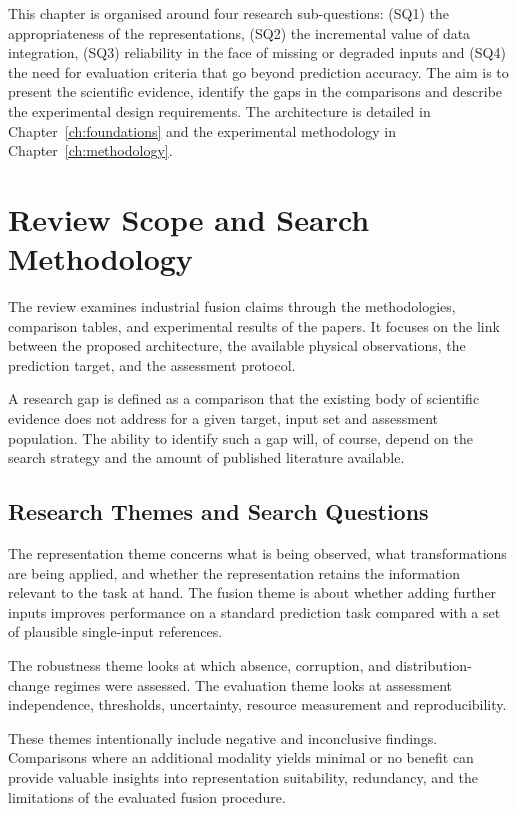 This chapter is organised around four research sub-questions: (SQ1) the appropriateness of the
representations, (SQ2) the incremental value of data integration, (SQ3) reliability in the face of
missing or degraded inputs and (SQ4) the need for evaluation criteria that go beyond prediction
accuracy. The aim is to present the scientific evidence, identify the gaps in the comparisons and
describe the experimental design requirements. The architecture is detailed in
Chapter~\ref{ch:foundations} and the experimental methodology in Chapter~\ref{ch:methodology}.

\section{Review Scope and Search Methodology}

The review examines industrial fusion claims through the methodologies, comparison tables, and
experimental results of the papers. It focuses on the link between the proposed architecture, the
available physical observations, the prediction target, and the assessment protocol.

A research gap is defined as a comparison that the existing body of scientific evidence does not
address for a given target, input set and assessment population. The ability to identify such a gap
will, of course, depend on the search strategy and the amount of published literature available.

\subsection{Research Themes and Search Questions}

The representation theme concerns what is being observed, what transformations are being applied,
and whether the representation retains the information relevant to the task at hand. The fusion
theme is about whether adding further inputs improves performance on a standard prediction task
compared with a set of plausible single-input references.

The robustness theme looks at which absence, corruption, and distribution-change regimes were
assessed. The evaluation theme looks at assessment independence, thresholds, uncertainty, resource
measurement and reproducibility.

These themes intentionally include negative and inconclusive findings. Comparisons where an
additional modality yields minimal or no benefit can provide valuable insights into representation
suitability, redundancy, and the limitations of the evaluated fusion procedure.

